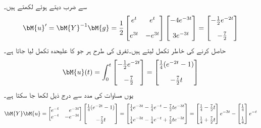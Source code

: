  سے ضرب دیتے ہوئے  لکھتے ہیں۔
\begin{align*}
\bM{u}'=\bM{Y}^{-1}\bM{g}=\frac{1}{2}\begin{bmatrix} e^{t} & e^{t}\\[1em] e^{3t}& -e^{3t}   \end{bmatrix}\begin{bmatrix} -4e^{-3t} \\[1em] 3e^{-3t} \end{bmatrix} =\begin{bmatrix}-\frac{1}{2}e^{-2t}\\[1em] -\frac{7}{2}\end{bmatrix}
\end{align*}
 حاصل کرنے کی خاطر تکمل لیتے ہیں۔تفرق کی طرح ہر جو کا علیحدہ تکمل لیا جاتا ہے۔
\begin{align*}
\bM{u}(t)=\int_{0}^{t}\begin{bmatrix}-\frac{1}{2}e^{-2t}\\[1em] -\frac{7}{2}\end{bmatrix}=\begin{bmatrix} \frac{1}{4}(e^{-2t}-1) \\[1em] -\frac{7}{2}t \end{bmatrix}
\end{align*}
یوں مساوات  کی مدد سے درج ذیل لکھا جا سکتا ہے۔
\begin{align*}
\bM{Y}\bM{u}=\begin{bmatrix*}[r] e^{-t}&e^{-3t} \\ e^{-t} &-e^{-3t} \end{bmatrix*}\begin{bmatrix} \frac{1}{4}(e^{-2t}-1) \\[1em] -\frac{7}{2}t \end{bmatrix}=\begin{bmatrix}\frac{1}{4}e^{-3t}-\frac{1}{4}e^{-t}-\frac{7}{2}te^{-3t}\\[1em] \frac{1}{4}e^{-3t}-\frac{1}{4}e^{-t}+\frac{7}{2}te^{-3t}  \end{bmatrix}=\begin{bmatrix} \frac{1}{4}-\frac{7}{2}t \\[1em] \frac{1}{4}+\frac{7}{2}t \end{bmatrix}e^{-3t}-\begin{bmatrix}\frac{1}{4}\\[1em] \frac{1}{4}  \end{bmatrix}e^{-t}
\end{align*}
